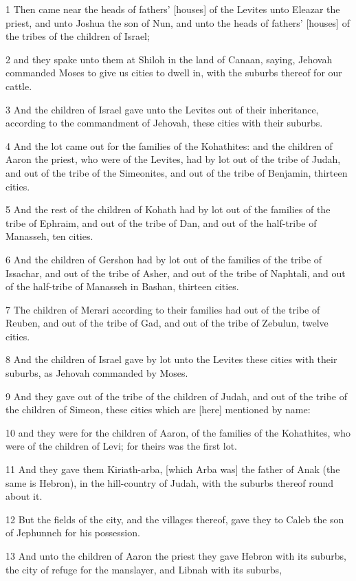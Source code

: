 \par 1 Then came near the heads of fathers' [houses] of the Levites unto Eleazar the priest, and unto Joshua the son of Nun, and unto the heads of fathers' [houses] of the tribes of the children of Israel;
\par 2 and they spake unto them at Shiloh in the land of Canaan, saying, Jehovah commanded Moses to give us cities to dwell in, with the suburbs thereof for our cattle.
\par 3 And the children of Israel gave unto the Levites out of their inheritance, according to the commandment of Jehovah, these cities with their suburbs.
\par 4 And the lot came out for the families of the Kohathites: and the children of Aaron the priest, who were of the Levites, had by lot out of the tribe of Judah, and out of the tribe of the Simeonites, and out of the tribe of Benjamin, thirteen cities.
\par 5 And the rest of the children of Kohath had by lot out of the families of the tribe of Ephraim, and out of the tribe of Dan, and out of the half-tribe of Manasseh, ten cities.
\par 6 And the children of Gershon had by lot out of the families of the tribe of Issachar, and out of the tribe of Asher, and out of the tribe of Naphtali, and out of the half-tribe of Manasseh in Bashan, thirteen cities.
\par 7 The children of Merari according to their families had out of the tribe of Reuben, and out of the tribe of Gad, and out of the tribe of Zebulun, twelve cities.
\par 8 And the children of Israel gave by lot unto the Levites these cities with their suburbs, as Jehovah commanded by Moses.
\par 9 And they gave out of the tribe of the children of Judah, and out of the tribe of the children of Simeon, these cities which are [here] mentioned by name:
\par 10 and they were for the children of Aaron, of the families of the Kohathites, who were of the children of Levi; for theirs was the first lot.
\par 11 And they gave them Kiriath-arba, [which Arba was] the father of Anak (the same is Hebron), in the hill-country of Judah, with the suburbs thereof round about it.
\par 12 But the fields of the city, and the villages thereof, gave they to Caleb the son of Jephunneh for his possession.
\par 13 And unto the children of Aaron the priest they gave Hebron with its suburbs, the city of refuge for the manslayer, and Libnah with its suburbs,
